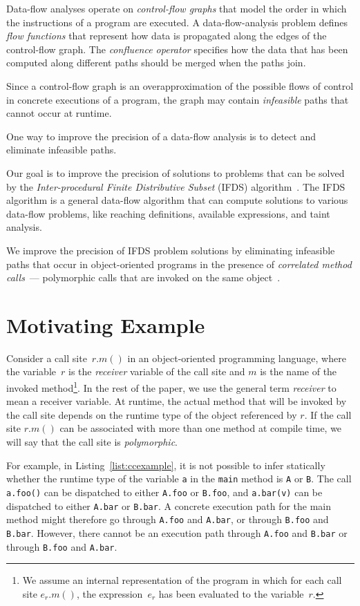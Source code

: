 \begin{odelete}
Data-flow analyses operate on \textit{control-flow graphs} that model the order in which the instructions of a program are executed.
A data-flow-analysis problem defines \textit{flow functions} that represent how data is propagated along the edges of the control-flow graph. The \textit{confluence operator} specifies how the data that has been computed along different paths should be merged when the paths join.

Since a control-flow graph is an overapproximation of the possible flows of control in concrete executions of a program, the graph may contain \textit{infeasible} paths that cannot occur at runtime.

One way to improve the precision of a data-flow analysis is to detect and eliminate infeasible paths.

Our goal is to improve the precision of solutions to problems that can be solved by the \textit{Inter-procedural Finite Distributive Subset} (IFDS) algorithm~\cite{reps1995precise}.
The IFDS algorithm is a general data-flow algorithm that can compute solutions to various data-flow problems, like reaching definitions, available expressions, and taint analysis.

We improve the precision of IFDS problem solutions by eliminating infeasible paths that occur in object-oriented programs in the presence of \textit{correlated method calls}~--- polymorphic calls that are invoked on the same object~\cite{DBLP:journals/scp/Tip15}.
\end{odelete}

\section{Motivating Example}

Consider a call site~$r.m()$ in an object-oriented programming language, where the variable~$r$ is the \textit{receiver} variable of the call site and $m$ is the name of the invoked method\footnote{We assume an internal representation of the program in which for each call site $e_r.m()$, the expression~$e_r$ has been evaluated to the variable~$r$.}. In the rest of the paper, we use the general term \textit{receiver} to mean a receiver variable.
At runtime, the actual method that will be invoked by the call site depends on the runtime type of the object referenced by $r$. If the call site $r.m()$ can be associated with more than one method at compile time, we will say that the call site is \textit{polymorphic}.

For example, in Listing~\ref{list:ccexample}, it is not possible to infer statically whether the runtime type of the variable \verb'a' in the \texttt{main} method is \verb'A' or \verb'B'.
The call \verb'a.foo()' can be dispatched to either \verb'A.foo' or \verb'B.foo', and \verb'a.bar(v)' can be dispatched to either \verb'A.bar' or \verb'B.bar'.
A concrete execution path for the main method might therefore go through \verb'A.foo' and \verb'A.bar', or through \verb'B.foo' and \verb'B.bar'.
However, there cannot be an execution path through \verb'A.foo' and \verb'B.bar' or through \verb'B.foo' and \verb'A.bar'.

